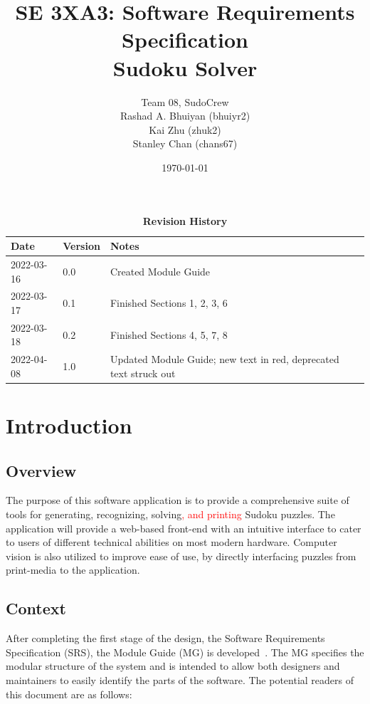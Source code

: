 \documentclass[12pt, titlepage]{article}
\title{SE 3XA3: Software Requirements Specification\\Sudoku Solver}
\author{Team 08, SudoCrew
		\\ Rashad A. Bhuiyan (bhuiyr2)
		\\ Kai Zhu (zhuk2)
		\\ Stanley Chan (chans67)
}
\date{\today}
\begin{document}
\maketitle

\tableofcontents
\listoftables
\listoffigures

\newpage

\begin{table}[h]
\caption{\bf Revision History}
\begin{tabularx}{\textwidth}{p{3cm}p{2cm}X}
\toprule {\bf Date} & {\bf Version} & {\bf Notes}\\
\midrule
2022-03-16 & 0.0 & Created Module Guide\\
2022-03-17 & 0.1 & Finished Sections 1, 2, 3, 6\\
2022-03-18 & 0.2 & Finished Sections 4, 5, 7, 8\\
2022-04-08 & 1.0 & Updated Module Guide; new text in red, deprecated text struck out\\
\bottomrule
\end{tabularx}
\end{table}

\newpage


\section{Introduction}

\subsection{Overview}
The purpose of this software application is to provide a comprehensive suite of tools for generating, recognizing, solving\textcolor{red}{, and printing} Sudoku puzzles. The application will provide a web-based front-end with an intuitive interface to cater to users of different technical abilities on most modern hardware. Computer vision is also utilized to improve ease of use, by directly interfacing puzzles from print-media to the application.

\subsection{Context}
After completing the first stage of the design, the Software Requirements
Specification (SRS), the Module Guide (MG) is developed~\citep{ParnasEtAl1984}. The MG
specifies the modular structure of the system and is intended to allow both
designers and maintainers to easily identify the parts of the software.  The
potential readers of this document are as follows:
\end{document}
